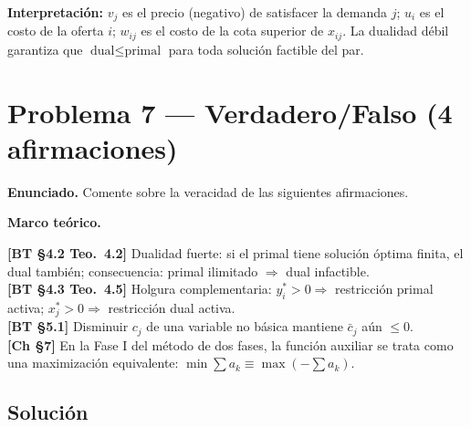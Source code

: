 \documentclass{article}
\newenvironment{marco}{\begin{mdframed}[linecolor=black!40,backgroundcolor=gray!5]\small\textbf{Marco teórico.}\par\smallskip}{\end{mdframed}\medskip}
\begin{document}
\textbf{Interpretación:} $v_j$ es el precio (negativo) de satisfacer la demanda $j$; $u_i$ es el costo de la oferta $i$; $w_{ij}$ es el costo de la cota superior de $x_{ij}$. La dualidad débil garantiza que $\text{dual} \leq \text{primal}$ para toda solución factible del par.

\section*{Problema 7 --- Verdadero/Falso (4 afirmaciones)}

\textbf{Enunciado.} Comente sobre la veracidad de las siguientes afirmaciones.

\begin{marco}
\textbf{[BT §4.2 Teo.\ 4.2]} Dualidad fuerte: si el primal tiene solución óptima finita, el dual también; consecuencia: primal ilimitado $\Rightarrow$ dual infactible. \\[2pt]
\textbf{[BT §4.3 Teo.\ 4.5]} Holgura complementaria: $y_i^* > 0 \Rightarrow$ restricción primal activa; $x_j^* > 0 \Rightarrow$ restricción dual activa. \\[2pt]
\textbf{[BT §5.1]} Disminuir $c_j$ de una variable no básica mantiene $\bar{c}_j$ aún $\leq 0$. \\[2pt]
\textbf{[Ch §7]} En la Fase I del método de dos fases, la función auxiliar se trata como una maximización equivalente: $\min\sum a_k \equiv \max(-\sum a_k)$.
\end{marco}

\subsection*{Solución}
\end{document}
